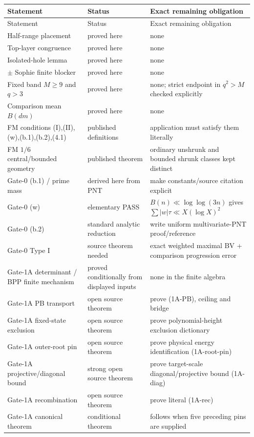 \documentclass[11pt]{article}
\theoremstyle{definition}
\theoremstyle{remark}
\newcommand{\1}{\mathbf 1}
\begin{document}
\begin{longtable}{p{}p{}p{}}
\toprule
Statement & Status & Exact remaining obligation\\
\midrule
\endfirsthead
\toprule
Statement & Status & Exact remaining obligation\\
\midrule
\endhead
Half-range placement & proved here & none\\
Top-layer congruence & proved here & none\\
Isolated-hole lemma & proved here & none\\
$\pm$ Sophie finite blocker & proved here & none\\
Fixed band $M\ge9$ and $q>3$ & proved here & none; strict endpoint in $q^2>M$ checked explicitly\\
Comparison mean $B(dm)$ & proved here & none\\
FM conditions (I),(II),(w),(b.1),(b.2),(4.1) & published definitions & application must satisfy them literally\\
FM $1/6$ central/bounded geometry & published theorem & ordinary unshrunk and bounded shrunk classes kept distinct\\
Gate-0 (b.1) / prime mass & derived here from PNT & make constants/source citation explicit\\
Gate-0 (w) & elementary PASS & $B(n)\ll\log\log(3n)$ gives $\sum|w|\tau\ll X(\log X)^2$\\
Gate-0 (b.2) & standard analytic reduction & write uniform multivariate-PNT proof/reference\\
Gate-0 Type I & source theorem needed & exact weighted maximal BV + comparison progression error\\
Gate-1A determinant / BPP finite mechanism & proved conditionally from displayed inputs & none in the finite algebra\\
Gate-1A PB transport & open source theorem & prove (1A-PB), ceiling and bridge\\
Gate-1A fixed-state exclusion & open source theorem & prove polynomial-height exclusion dictionary\\
Gate-1A outer-root pin & open source theorem & prove physical energy identification (1A-root-pin)\\
Gate-1A projective/diagonal bound & strong open source theorem & prove target-scale diagonal/projective bound (1A-diag)\\
Gate-1A recombination & open source theorem & prove literal (1A-rec)\\
Gate-1A canonical theorem & conditional theorem & follows when five preceding pins are supplied\\

\end{longtable}
\end{document}
